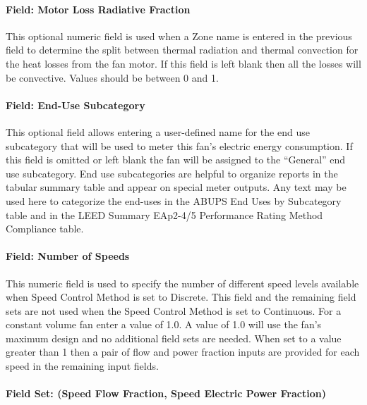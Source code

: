 \paragraph{Field: Motor Loss Radiative Fraction}\label{field-loss-rad-frac-fansysmodel}

This optional numeric field is used when a Zone name is entered in the previous field to determine the split between thermal radiation and thermal convection for the heat losses from the fan motor. If this field is left blank then all the losses will be convective.  Values should be between 0 and 1.

\paragraph{Field: End-Use Subcategory}\label{field-end-use-subcat-fansysmodel}

This optional field allows entering a user-defined name for the end use subcategory that will be used to meter this fan's electric energy consumption. If this field is omitted or left blank the fan will be assigned to the ``General'' end use subcategory.  End use subcategories are helpful to organize reports in the tabular summary table and appear on special meter outputs. Any text may be used here to categorize the end-uses in the ABUPS End Uses by Subcategory table and in the LEED Summary EAp2-4/5 Performance Rating Method Compliance table.

\paragraph{Field: Number of Speeds}\label{field-num-speeds-fansysmodel}

This numeric field is used to specify the number of different speed levels available when Speed Control Method is set to Discrete. This field and the remaining field sets are not used when the Speed Control Method is set to Continuous.  For a constant volume fan enter a value of 1.0.  A value of 1.0 will use the fan's maximum design and no additional field sets are needed.  When set to a value greater than 1 then a pair of flow and power fraction inputs are provided for each speed in the remaining input fields.

\paragraph{Field Set: (Speed Flow Fraction, Speed Electric Power Fraction)}\label{fieldset-flow-power-fractions-fansysmodel}

